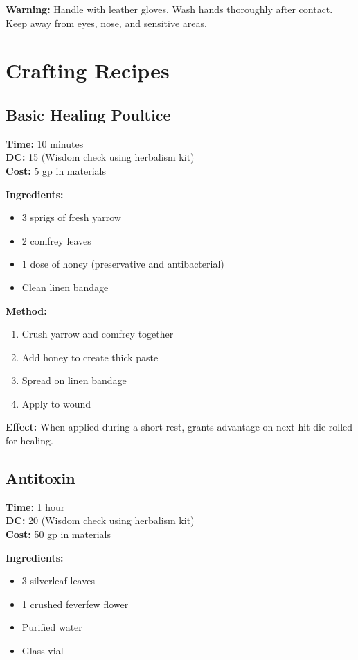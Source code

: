 \documentclass[letterpaper,twocolumn,openany]{dndbook}
\begin{document}
\textbf{Warning:} Handle with leather gloves. Wash hands thoroughly after contact. Keep away from eyes, nose, and sensitive areas.

\chapter{Crafting Recipes}

\section{Basic Healing Poultice}

\textbf{Time:} 10 minutes \\
\textbf{DC:} 15 (Wisdom check using herbalism kit) \\
\textbf{Cost:} 5 gp in materials

\textbf{Ingredients:}
\begin{itemize}
    \item 3 sprigs of fresh yarrow
    \item 2 comfrey leaves
    \item 1 dose of honey (preservative and antibacterial)
    \item Clean linen bandage
\end{itemize}

\textbf{Method:}
\begin{enumerate}
    \item Crush yarrow and comfrey together
    \item Add honey to create thick paste
    \item Spread on linen bandage
    \item Apply to wound
\end{enumerate}

\textbf{Effect:} When applied during a short rest, grants advantage on next hit die rolled for healing.

\section{Antitoxin}

\textbf{Time:} 1 hour \\
\textbf{DC:} 20 (Wisdom check using herbalism kit) \\
\textbf{Cost:} 50 gp in materials

\textbf{Ingredients:}
\begin{itemize}
    \item 3 silverleaf leaves
    \item 1 crushed feverfew flower
    \item Purified water
    \item Glass vial
\end{itemize}
\end{document}
